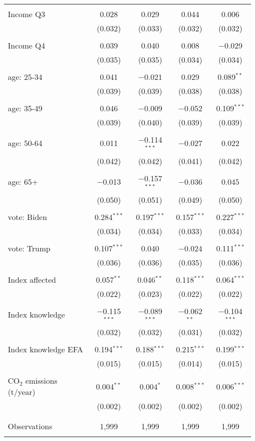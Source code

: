 \begin{tabular}{@{\extracolsep{5pt}}lcccc}
  & & & & \\ 
 Income Q3 & 0.028 & 0.029 & 0.044 & 0.006 \\ 
  & (0.032) & (0.033) & (0.032) & (0.032) \\ 
  & & & & \\ 
 Income Q4 & 0.039 & 0.040 & 0.008 & $-$0.029 \\ 
  & (0.035) & (0.035) & (0.034) & (0.034) \\ 
  & & & & \\ 
 age: 25-34 & 0.041 & $-$0.021 & 0.029 & 0.089$^{**}$ \\ 
  & (0.039) & (0.039) & (0.038) & (0.038) \\ 
  & & & & \\ 
 age: 35-49 & 0.046 & $-$0.009 & $-$0.052 & 0.109$^{***}$ \\ 
  & (0.039) & (0.040) & (0.039) & (0.039) \\ 
  & & & & \\ 
 age: 50-64 & 0.011 & $-$0.114$^{***}$ & $-$0.027 & 0.022 \\ 
  & (0.042) & (0.042) & (0.041) & (0.042) \\ 
  & & & & \\ 
 age: 65+ & $-$0.013 & $-$0.157$^{***}$ & $-$0.036 & 0.045 \\ 
  & (0.050) & (0.051) & (0.049) & (0.050) \\ 
  & & & & \\ 
 vote: Biden & 0.284$^{***}$ & 0.197$^{***}$ & 0.157$^{***}$ & 0.227$^{***}$ \\ 
  & (0.034) & (0.034) & (0.033) & (0.034) \\ 
  & & & & \\ 
 vote: Trump & 0.107$^{***}$ & 0.040 & $-$0.024 & 0.111$^{***}$ \\ 
  & (0.036) & (0.036) & (0.035) & (0.036) \\ 
  & & & & \\ 
 Index affected & 0.057$^{**}$ & 0.046$^{**}$ & 0.118$^{***}$ & 0.064$^{***}$ \\ 
  & (0.022) & (0.023) & (0.022) & (0.022) \\ 
  & & & & \\ 
 Index knowledge & $-$0.115$^{***}$ & $-$0.089$^{***}$ & $-$0.062$^{**}$ & $-$0.104$^{***}$ \\ 
  & (0.032) & (0.032) & (0.031) & (0.032) \\ 
  & & & & \\ 
 Index knowledge EFA & 0.194$^{***}$ & 0.188$^{***}$ & 0.215$^{***}$ & 0.199$^{***}$ \\ 
  & (0.015) & (0.015) & (0.014) & (0.015) \\ 
  & & & & \\ 
 CO$_{2}$ emissions (t/year) & 0.004$^{**}$ & 0.004$^{*}$ & 0.008$^{***}$ & 0.006$^{***}$ \\ 
  & (0.002) & (0.002) & (0.002) & (0.002) \\ 
  & & & & \\ 
\hline \\[-1.8ex] 

Observations & 1,999 & 1,999 & 1,999 & 1,999 \\ 
\hline 
\hline \\[-1.8ex] 
\end{tabular} 
